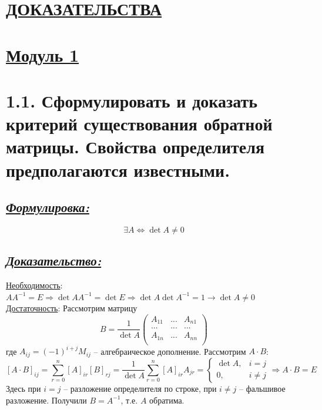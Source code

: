 \documentclass{article}
\begin{document}
\newpage
{}
\section*{\LARGE\centering \underline{ДОКАЗАТЕЛЬСТВА}}

\section*{\LARGE\centering \underline{Модуль 1}}

\section*{\LARGE 1.1. Сформулировать и доказать критерий существования обратной матрицы. Свойства определителя предполагаются известными.}
\subsection*{\Large \underline{\textit{Формулировка: }}}
$$\exists A \Leftrightarrow \det{A} \ne 0$$ 

\subsection*{\Large \underline{\textit{Доказательство: }}}
\underline{Необходимость}:
\newline $AA^{-1} = E \Rightarrow \det{AA^{-1}} = \det{E} \Rightarrow \det{A}\det{A^{-1}} = 1 \rightarrow \det{A} \ne 0$
\newline \underline{Достаточность}:
\newline Рассмотрим матрицу 
$$
B = 
\frac{1}{\det{A}}
\begin{pmatrix}
A_{11} & ... & A_{n1} \\
... & ... & ... \\
A_{1n} & ... & A_{nn} \\
\end{pmatrix}
$$
где $A_{ij} = (-1)^{i + j}M_{ij}$ -- алгебраическое дополнение. Рассмотрим $A \cdot B$:
$$
[A \cdot B]_{ij} = \sum_{r = 0}^{n} [A]_{ir}[B]_{rj} = \frac{1}{\det{A}} \sum_{r = 0}^{n} [A]_{ir} A_{jr} = 
\begin{cases}
\det{A}, & i = j \\
0, & i \ne j 
\end{cases}
\Rightarrow A \cdot B = E
$$
Здесь при $i = j$ -- разложение определителя по строке, при $i \ne j$ -- фальшивое разложение. Получили $B = A^{-1}$, т.е. $A$ обратима.
\end{document}
